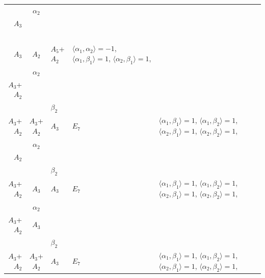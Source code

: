 \documentclass[12pt]{report}
\begin{document}
\begin{appendix}
{\begin{longtable}{rcl p{1cm}p{1cm}p{3cm} }
\\
\begin{tabular}{cc}$\alpha_1$+ & $\alpha_2$\\\tiny{ $A_3$ } & \tiny{  }\end{tabular} &\begin{tabular}{c} = \\~ \end{tabular} & \begin{tabular}{c}$\beta_1$\\\tiny{ $A_3$ }\end{tabular} & $A_2$ & $A_5$+$A_2$ & $\langle\alpha_1, \alpha_2\rangle=-1$,  $\langle\alpha_1, \beta_1\rangle=1$, $\langle\alpha_2, \beta_1\rangle=1$, 
\\
\begin{tabular}{cc}$\alpha_1$+ & $\alpha_2$\\\tiny{ $A_3$+$A_2$ } & \tiny{  }\end{tabular} &\begin{tabular}{c} = \\~ \end{tabular} & \begin{tabular}{cc}$\beta_1$+ & $\beta_2$\\\tiny{ $A_3$+$A_2$ } & \tiny{ $A_3$+$A_2$ }\end{tabular} & $A_3$ & $E_7$ &  $\langle\alpha_1, \beta_1\rangle=1$, $\langle\alpha_1, \beta_2\rangle=1$, $\langle\alpha_2, \beta_1\rangle=1$, $\langle\alpha_2, \beta_2\rangle=1$, 
\\
\begin{tabular}{cc}$\alpha_1$+ & $\alpha_2$\\\tiny{ $A_2$ } & \tiny{  }\end{tabular} &\begin{tabular}{c} = \\~ \end{tabular} & \begin{tabular}{cc}$\beta_1$+ & $\beta_2$\\\tiny{ $A_3$+$A_2$ } & \tiny{ $A_3$ }\end{tabular} & $A_3$ & $E_7$ &  $\langle\alpha_1, \beta_1\rangle=1$, $\langle\alpha_1, \beta_2\rangle=1$, $\langle\alpha_2, \beta_1\rangle=1$, $\langle\alpha_2, \beta_2\rangle=1$, 
\\
\begin{tabular}{cc}$\alpha_1$+ & $\alpha_2$\\\tiny{ $A_3$+$A_2$ } & \tiny{ $A_3$ }\end{tabular} &\begin{tabular}{c} = \\~ \end{tabular} & \begin{tabular}{cc}$\beta_1$+ & $\beta_2$\\\tiny{ $A_3$+$A_2$ } & \tiny{ $A_3$+$A_2$ }\end{tabular} & $A_3$ & $E_7$ &  $\langle\alpha_1, \beta_1\rangle=1$, $\langle\alpha_1, \beta_2\rangle=1$, $\langle\alpha_2, \beta_1\rangle=1$, $\langle\alpha_2, \beta_2\rangle=1$, 

\end{longtable}}
\end{appendix}
\end{document}
